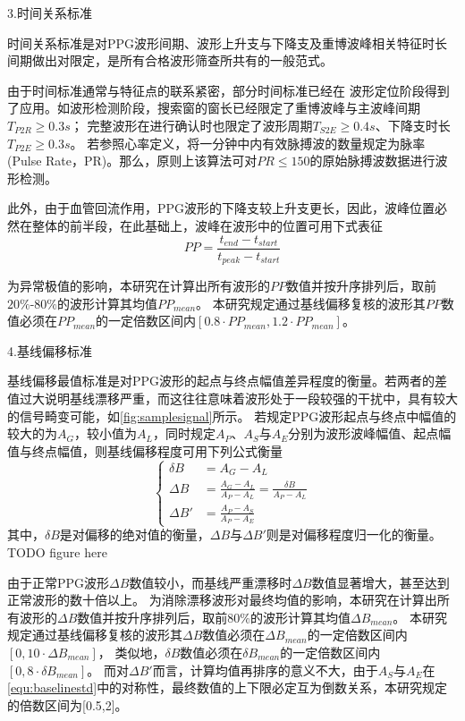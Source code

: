 3.时间关系标准

时间关系标准是对PPG波形间期、波形上升支与下降支及重博波峰相关特征时长间期做出对限定，是所有合格波形筛查所共有的一般范式。

由于时间标准通常与特征点的联系紧密，部分时间标准已经在
波形定位阶段得到了应用。如波形检测阶段，搜索窗的窗长已经限定了重博波峰与主波峰间期$T_{P2R}\ge0.3s$；
完整波形在进行确认时也限定了波形周期$T_{S2E}\ge 0.4s$、下降支时长$T_{P2E}\ge 0.3s$。
若参照心率定义，将一分钟中内有效脉搏波的数量规定为脉率(Pulse Rate，PR)。那么，原则上该算法可对$PR \le 150$的原始脉搏波数据进行波形检测。

此外，由于血管回流作用，PPG波形的下降支较上升支更长，因此，波峰位置必然在整体的前半段，在此基础上，波峰在波形中的位置可用下式表征
\begin{equation}
    \label{equ:timestd}
    PP = \frac{t_{end}-t_{start}}{t_{peak}-t_{start}}
\end{equation}

为异常极值的影响，本研究在计算出所有波形的$PP$数值并按升序排列后，取前$20\%$-$80\%$的波形计算其均值${PP}_{mean}$。
本研究规定通过基线偏移复核的波形其$PP$数值必须在${PP}_{mean}$的一定倍数区间内$[0.8 \cdot {PP}_{mean},1.2 \cdot {PP}_{mean}]$。

4.基线偏移标准

基线偏移最值标准是对PPG波形的起点与终点幅值差异程度的衡量。若两者的差值过大说明基线漂移严重，而这往往意味着波形处于一段较强的干扰中，具有较大的信号畸变可能，如\autoref{fig:samplesignal}所示。
若规定PPG波形起点与终点中幅值的较大的为$A_G$，较小值为$A_L$，同时规定$A_P$、$A_S$与$A_E$分别为波形波峰幅值、起点幅值与终点幅值，则基线偏移程度可用下列公式衡量
\begin{equation}
    \label{equ:baselinestd}
    \left \{
    \begin{aligned}
        \delta B &=A_G-A_L \\
        \Delta B &=\frac{A_G-A_L}{A_P-A_L}=\frac{\delta B}{A_P-A_L}\\
        \Delta B' &=\frac{A_P-A_S}{A_P-A_E}
    \end{aligned}
    \right.
\end{equation}
其中，$\delta B$是对偏移的绝对值的衡量，$\Delta B$与$\Delta B'$则是对偏移程度归一化的衡量。
TODO figure here

由于正常PPG波形$\Delta B$数值较小，而基线严重漂移时$\Delta B$数值显著增大，甚至达到正常波形的数十倍以上。
为消除漂移波形对最终均值的影响，本研究在计算出所有波形的$\Delta B$数值并按升序排列后，取前$80\%$的波形计算其均值${\Delta B}_{mean}$。
本研究规定通过基线偏移复核的波形其$\Delta B$数值必须在${\Delta B}_{mean}$的一定倍数区间内$[0,10 \cdot {\Delta B}_{mean}]$，
类似地，$\delta B$数值必须在${\delta B}_{mean}$的一定倍数区间内$[0,8 \cdot {\delta B}_{mean}]$。
而对$\Delta B'$而言，计算均值再排序的意义不大，由于$A_S$与$A_E$在\autoref{equ:baselinestd}中的对称性，最终数值的上下限必定互为倒数关系，本研究规定的倍数区间为[0.5,2]。

